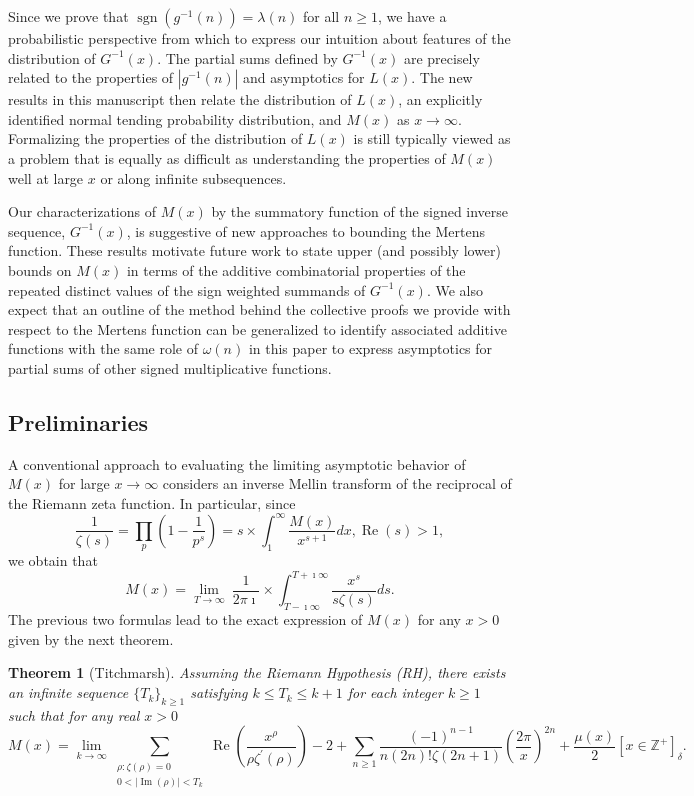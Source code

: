 \documentclass[11pt,reqno,a4letter]{article}
\numberwithin{figure}{section}
\numberwithin{table}{section}
\newcommand{\Iverson}[1]{\ensuremath{\left[#1\right]_{\delta}}}
\theoremstyle{plain}
\newtheorem{theorem}{Theorem}
\numberwithin{theorem}{section}
\theoremstyle{definition}
\renewcommand{\Re}{\operatorname{Re}}
\renewcommand{\Im}{\operatorname{Im}}
\begin{document}
Since we prove that $\operatorname{sgn}(g^{-1}(n)) = \lambda(n)$ for all $n \geq 1$, 
we have a probabilistic perspective from which to express 
our intuition about features of the distribution of $G^{-1}(x)$. 
The partial sums defined by $G^{-1}(x)$ are precisely related to the properties of 
$|g^{-1}(n)|$ and asymptotics for $L(x)$. 
The new results in this manuscript then relate the 
distribution of $L(x)$, an explicitly identified 
normal tending probability distribution, and $M(x)$ as $x \rightarrow \infty$. 
Formalizing the properties of the distribution of 
$L(x)$ is still typically viewed as a problem that is equally as difficult 
as understanding the properties of $M(x)$ well at large $x$ or along infinite subsequences. 

Our characterizations of $M(x)$ by the summatory function of the signed 
inverse sequence, $G^{-1}(x)$, 
is suggestive of new approaches to bounding the Mertens function. 
These results motivate future work to state upper (and possibly lower) bounds 
on $M(x)$ in terms of the additive combinatorial properties of the repeated distinct 
values of the sign weighted summands of $G^{-1}(x)$. 
We also expect that an outline of the method behind the collective proofs we 
provide with respect to the Mertens function can be generalized to identify 
associated additive functions with the same role of $\omega(n)$ in this paper to 
express asymptotics for partial sums of other signed multiplicative functions. 

\subsection{Preliminaries}
\label{subSection_Intro_Mx_properties} 

A conventional approach to evaluating the limiting asymptotic 
behavior of $M(x)$ for large $x \rightarrow \infty$ considers an 
inverse Mellin transform of the reciprocal of the Riemann zeta function. 
In particular, since 
\[
\frac{1}{\zeta(s)} = \prod_{p} \left(1 - \frac{1}{p^s}\right) = 
     s \times \int_1^{\infty} \frac{M(x)}{x^{s+1}} dx, \Re(s) > 1, 
\]
we obtain that 
\[
M(x) = \lim_{T \rightarrow \infty}\ \frac{1}{2\pi\imath} \times \int_{T-\imath\infty}^{T+\imath\infty} 
     \frac{x^s}{s \zeta(s)} ds. 
\] 
The previous two formulas lead to the 
exact expression of $M(x)$ for any $x > 0$ 
given by the next theorem. 
\nocite{TITCHMARSH} 

\begin{theorem}[Titchmarsh] 
\label{theorem_MxMellinTransformInvFormula} 
Assuming the Riemann Hypothesis (RH), there exists an infinite sequence 
$\{T_k\}_{k \geq 1}$ satisfying $k \leq T_k \leq k+1$ for each integer $k \geq 1$ 
such that for any real $x > 0$ 
\[
M(x) = \lim_{k \rightarrow \infty} 
     \sum_{\substack{\rho: \zeta(\rho) = 0 \\ 0 < |\Im(\rho)| < T_k}} 
     \Re\left(\frac{x^{\rho}}{\rho \zeta^{\prime}(\rho)}\right) - 2 + 
     \sum_{n \geq 1} \frac{(-1)^{n-1}}{n (2n)! \zeta(2n+1)} 
     \left(\frac{2\pi}{x}\right)^{2n} + 
     \frac{\mu(x)}{2} \Iverson{x \in \mathbb{Z}^{+}}. 
\] 
\end{theorem} 
\end{document}
